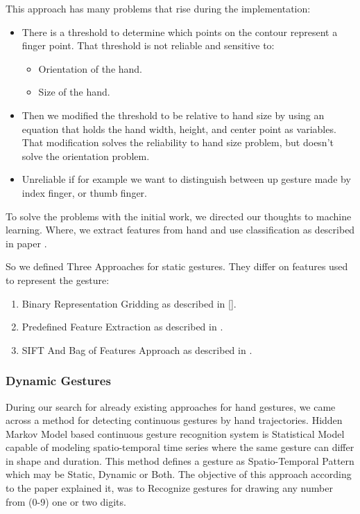 This approach has many problems that rise during the implementation:\bigskip


\begin{itemize}
\item There is a threshold to determine which points on the contour represent a finger point. That threshold is not reliable and sensitive to:
\begin{itemize}
\item Orientation of the hand.
\item Size of the hand.
\end{itemize}
\item Then we modified the threshold to be relative to hand size by using an equation that holds the hand width, height, and center point as variables.
That modification solves the reliability to hand size problem, but doesn't solve the orientation problem.
\item Unreliable if for example we want to distinguish between up gesture made by index finger, or thumb finger.
\end{itemize}
\bigskip

To solve the problems with the initial work, we directed our thoughts to machine learning. Where, we extract features from hand and use classification as described in paper \cite{relatedsg6}.
\bigskip

So we defined Three Approaches for static gestures. They differ on features used to represent the gesture:
\begin{enumerate}
\item Binary Representation Gridding as described in [].
\item Predefined Feature Extraction as described in \cite{paper2sT}.
\item SIFT And Bag of Features Approach as described in \cite{dardas}.
\end{enumerate}
\bigskip
\subsubsection{Dynamic Gestures} 
During our search for already existing approaches for hand gestures, we came across a method 
for detecting continuous gestures by hand trajectories. Hidden Markov Model based \cite{hoda} 
continuous gesture recognition system is Statistical Model capable of modeling spatio-temporal 
time series where the same gesture can differ in shape and duration. This method defines a 
gesture as Spatio-Temporal Pattern which may be Static, Dynamic or Both. The objective of 
this approach according to the paper explained it, was to Recognize gestures for drawing any 
number from (0-9) one or two digits.
\bigskip

